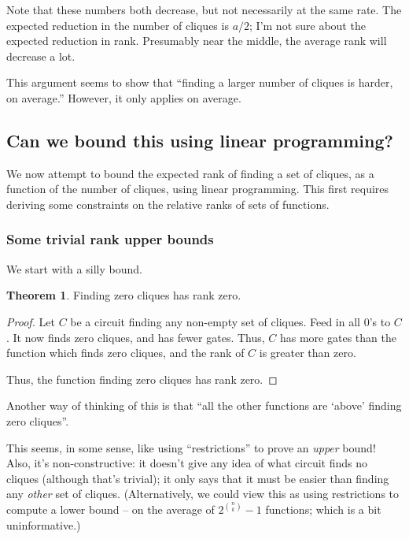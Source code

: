 \documentclass[12pt]{article}
\theoremstyle{definition}
\newtheorem{thm}{Theorem}[section]
\begin{document}
Note that these numbers both decrease, but not necessarily at the same rate.
The expected reduction in the number of cliques is $a/2$; I'm not sure
about the expected reduction in rank. Presumably near the middle, the
average rank will decrease a lot.

This argument seems to show that ``finding a larger number of cliques is
harder, on average.'' However, it only applies
on average.

\subsection{Can we bound this using linear programming?}

We now attempt to bound the expected rank of finding a set
of cliques, as a function of the number of cliques, using
linear programming.
This first requires deriving some constraints on the
relative ranks of sets of functions.

\subsubsection{Some trivial rank upper bounds}

We start with a silly bound.

\begin{thm}
\label{zeroCliques}
Finding zero cliques has rank zero.
\end{thm}
\begin{proof}

Let $C$ be a circuit finding any non-empty set of cliques.
Feed in all 0's to $C$. It now finds zero cliques, and has
fewer gates. Thus, $C$ has more gates than the function
which finds zero cliques, and the rank of $C$ is greater
than zero.

Thus, the function finding zero cliques has rank zero.

\end{proof}
 
Another way of thinking of this is that ``all the other functions
are `above' finding zero cliques''.

This seems, in some sense, like using ``restrictions'' to prove an {\em upper} bound!
Also, it's non-constructive: it doesn't give any idea of what circuit finds no cliques
(although that's trivial); it only says that it must be easier than finding any
{\em other} set of cliques. (Alternatively, we could view this as using restrictions
to compute a lower bound -- on the average of $2^{n \choose k} - 1$ functions; which
is a bit uninformative.)
\end{document}
